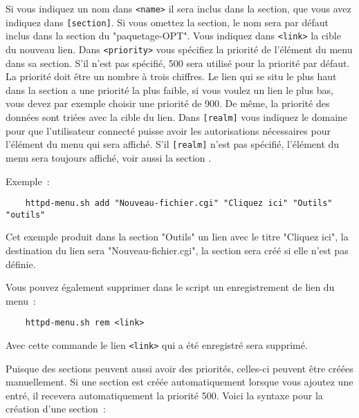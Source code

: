 Si vous indiquez un nom dans \texttt{<name>} il sera inclus dans la section,
que vous avez indiquez dans \texttt{[section]}. Si vous omettez la section, le nom
sera par défaut inclus dans la section du "paquetage-OPT". Vous indiquez dans
\texttt{<link>} la cible du nouveau lien. Dans \texttt{<priority>} vous spécifiez
la priorité de l'élément du menu dans sa section. S'il n'est pas spécifié, 500 sera
utilisé pour la priorité par défaut. La priorité doit être un nombre à trois chiffres.
Le lien qui se situ le plus haut dans la section a une priorité la plus faible, si
vous voulez un lien le plus bas, vous devez par exemple choisir une priorité de 900.
De même, la priorité des données sont triées avec la cible du lien. Dans \texttt{[realm]}
vous indiquez le domaine pour que l'utilisateur connecté puisse avoir les autorisations
nécessaires pour  l'élément du menu qui sera affiché. S'il \texttt{[realm]} n'est
pas spécifié, l'élément du menu sera toujours affiché, voir aussi la section
.

Exemple~:

\begin{example}
\begin{verbatim}
    httpd-menu.sh add "Nouveau-fichier.cgi" "Cliquez ici" "Outils" "outils"
\end{verbatim}
\end{example}

Cet exemple produit dans la section "Outils" un lien avec le titre "Cliquez ici",
la destination du lien sera "Nouveau-fichier.cgi", la section sera créé si elle n'est
pas définie.

Vous pouvez également supprimer dans le script un enregistrement de lien du menu~:

\begin{example}
\begin{verbatim}
    httpd-menu.sh rem <link>
\end{verbatim}
\end{example}

Avec cette commande le lien \texttt{<link>} qui a été enregistré sera supprimé.


Puisque des sections peuvent aussi avoir des priorités, celles-ci peuvent être créées
manuellement. Si une section est créée automatiquement lorsque vous ajoutez une entré,
il recevera automatiquement la priorité 500. Voici la syntaxe pour la création d'une section~:

